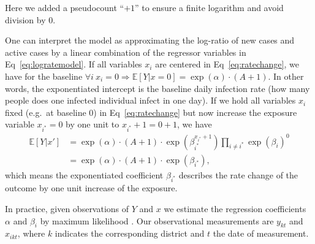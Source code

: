 \documentclass[10pt,letterpaper]{article}
\begin{document}
Here we added a pseudocount ``\(+1\)'' to ensure a finite logarithm and
avoid division by \(0\).

One can interpret the model as approximating the log-ratio of new cases
and active cases by a linear combination of the regressor variables in Eq~\eqref{eq:logratemodel}. If all variables \(x_i\) are centered in Eq~\eqref{eq:ratechange}, we have for the baseline
\(\forall i\ x_i=0 \Rightarrow \mathbb{E}[Y|x=0]=\exp(\alpha)\cdot (A+1)\).
In other words, the exponentiated intercept is the baseline daily
infection rate (how many people does one infected individual infect in
one day). If we hold all variables \(x_i\) fixed (e.g.~at baseline 0) in Eq~\eqref{eq:ratechange} but now increase the exposure variable
\(x_{i^{\ast}}=0\) by one unit to \(x_{i^{\ast}}+1=0+1\), we have
\begin{align*}
\mathbb{E}[Y|x']&=\exp(\alpha)\cdot(A+1)\cdot\exp(\beta_{i^{\ast}}^{x_{i^{\ast}}+1})\prod_{i\neq i^{\ast}}\exp(\beta_i)^0 \\
&=\exp(\alpha)\cdot(A+1)\cdot\exp(\beta_{i^{\ast}}),
\end{align*}
which means the exponentiated coefficient \(\beta_{i^{\ast}}\) describes
the rate change of the outcome by one unit increase of the exposure.

In practice, given observations of \(Y\) and \(x\) we estimate the
regression coefficients \(\alpha\) and \(\beta_i\) by maximum
likelihood \cite{maxlikelihood}. Our observational measurements are
\(y_{kt}\) and \(x_{ikt}\), where \(k\) indicates the corresponding
district and \(t\) the date of measurement.
\end{document}
